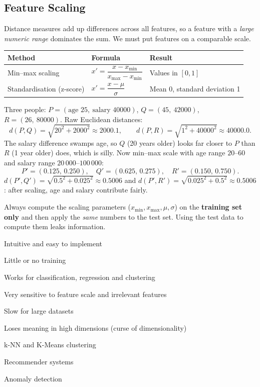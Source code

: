 \subsection{Feature Scaling}

Distance measures add up differences across all features, so a feature with a \emph{large numeric range} dominates the sum. We must put features on a comparable scale.

\begin{center}
\begin{tabular}{@{}p{3.6cm}p{5cm}p{4.6cm}@{}}
\toprule
\textbf{Method} & \textbf{Formula} & \textbf{Result}\\
\midrule
Min--max scaling & $x'=\dfrac{x-x_{\min}}{x_{\max}-x_{\min}}$ & Values in $[0,1]$\\[3mm]
Standardisation (z-score) & $x'=\dfrac{x-\mu}{\sigma}$ & Mean 0, standard deviation 1\\
\bottomrule
\end{tabular}
\end{center}

\begin{example}
Three people: $P=(\text{age }25,\ \text{salary }40000)$, $Q=(45,\ 42000)$, $R=(26,\ 80000)$. Raw Euclidean distances:
\[
d(P,Q)=\sqrt{20^2+2000^2}\approx2000.1,\qquad d(P,R)=\sqrt{1^2+40000^2}\approx40000.0 .
\]
The salary difference swamps age, so $Q$ (20 years older) looks far closer to $P$ than $R$ (1 year older) does, which is silly. Now min--max scale with age range $20$--$60$ and salary range $20\,000$--$100\,000$:
\[
P'=(0.125,\,0.250),\quad Q'=(0.625,\,0.275),\quad R'=(0.150,\,0.750).
\]
$d(P',Q')=\sqrt{0.5^2+0.025^2}\approx0.5006$ and $d(P',R')=\sqrt{0.025^2+0.5^2}\approx0.5006$: after scaling, age and salary contribute fairly.
\end{example}

\begin{warning}
Always compute the scaling parameters ($x_{\min},x_{\max},\mu,\sigma$) on the \textbf{training set only} and then apply the \emph{same} numbers to the test set. Using the test data to compute them leaks information.
\end{warning}

{\item Intuitive and easy to implement
 \item Little or no training
 \item Works for classification, regression and clustering}
{\item Very sensitive to feature scale and irrelevant features
 \item Slow for large datasets
 \item Loses meaning in high dimensions (curse of dimensionality)}
{\item k-NN and K-Means clustering
 \item Recommender systems
 \item Anomaly detection}

